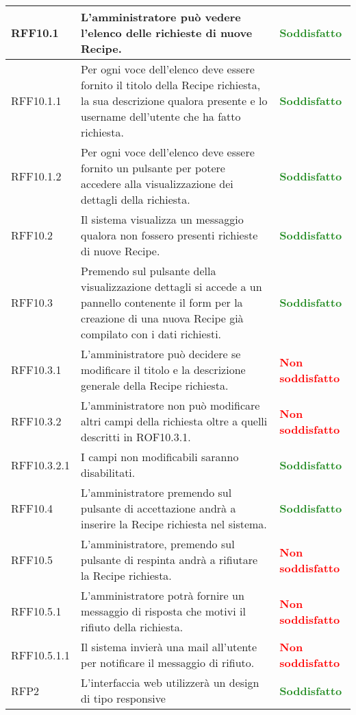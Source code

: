\begin{center}
\begin{longtable}{| p{2.5cm} | p{8cm} | p{3.5cm} |}
		\hline
		RFF10.1  &  L'amministratore può vedere l'elenco delle richieste di nuove Recipe.  & \textbf{\textcolor{forestgreen}{Soddisfatto}} \\
		\hline
		RFF10.1.1  &  Per ogni voce dell'elenco deve essere fornito il titolo della Recipe richiesta, la sua descrizione qualora presente e lo username dell'utente che ha fatto richiesta.  & \textbf{\textcolor{forestgreen}{Soddisfatto}} \\
		\hline
		RFF10.1.2  &  Per ogni voce dell'elenco deve essere fornito un pulsante per potere accedere alla visualizzazione dei dettagli della richiesta.  & \textbf{\textcolor{forestgreen}{Soddisfatto}} \\
		\hline
		RFF10.2  &  Il sistema visualizza un messaggio qualora non fossero presenti richieste di nuove Recipe.  & \textbf{\textcolor{forestgreen}{Soddisfatto}} \\
		\hline
		RFF10.3  &  Premendo sul pulsante della visualizzazione dettagli si accede a un pannello contenente il form per la creazione di una nuova Recipe già compilato con i dati richiesti.  &  \textbf{\textcolor{forestgreen}{Soddisfatto}} \\
		\hline
		RFF10.3.1  &  L'amministratore può decidere se modificare il titolo e la descrizione generale della Recipe richiesta.  & \textbf{\textcolor{red}{Non soddisfatto}} \\
		\hline
		RFF10.3.2  &  L'amministratore non può modificare altri campi della richiesta oltre a quelli descritti in ROF10.3.1.  & \textbf{\textcolor{red}{Non soddisfatto}} \\
		\hline
		RFF10.3.2.1  &  I campi non modificabili saranno disabilitati.  & \textbf{\textcolor{forestgreen}{Soddisfatto}} \\
		\hline
		RFF10.4  &  L'amministratore premendo sul pulsante di accettazione andrà a inserire la Recipe richiesta nel sistema.  & \textbf{\textcolor{forestgreen}{Soddisfatto}} \\
		\hline
		RFF10.5  &  L'amministratore, premendo sul pulsante di respinta andrà a rifiutare la Recipe richiesta.  & \textbf{\textcolor{red}{Non soddisfatto}} \\
		\hline
		RFF10.5.1  &  L'amministratore potrà fornire un messaggio di risposta che motivi il rifiuto della richiesta.  & \textbf{\textcolor{red}{Non soddisfatto}} \\
		\hline
		RFF10.5.1.1  &  Il sistema invierà una mail all'utente per notificare il messaggio di rifiuto.  &  \textbf{\textcolor{red}{Non soddisfatto}} \\
		\hline
		RFP2  &  L'interfaccia web utilizzerà un design di tipo responsive  &  \textbf{\textcolor{forestgreen}{Soddisfatto}} \\
		\hline
	\end{longtable}
	\egroup
\end{center}


